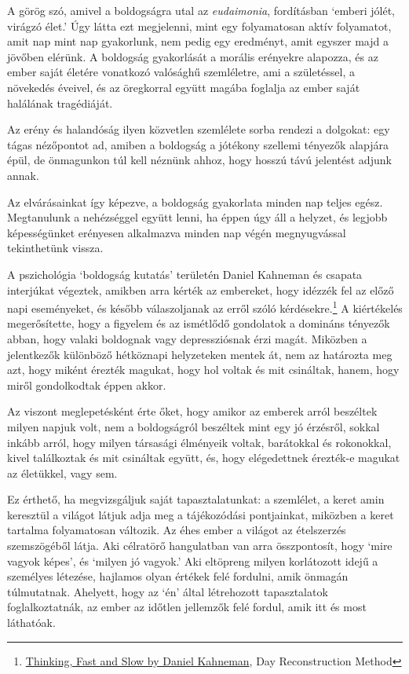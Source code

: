A görög szó, amivel a boldogságra utal az \emph{eudaimonia}, fordításban
`emberi jólét, virágzó élet.' Úgy látta ezt megjelenni, mint egy
folyamatosan aktív folyamatot, amit nap mint nap gyakorlunk, nem pedig
egy eredményt, amit egyszer majd a jövőben elérünk. A boldogság
gyakorlását a morális erényekre alapozza, és az ember saját életére
vonatkozó valósághű szemléletre, ami a születéssel, a növekedés éveivel,
és az öregkorral együtt magába foglalja az ember saját halálának
tragédiáját.

Az erény és halandóság ilyen közvetlen szemlélete sorba rendezi a
dolgokat: egy tágas nézőpontot ad, amiben a boldogság a jótékony
szellemi tényezők alapjára épül, de önmagunkon túl kell néznünk ahhoz,
hogy hosszú távú jelentést adjunk annak.

Az elvárásainkat így képezve, a boldogság gyakorlata minden nap teljes
egész. Megtanulunk a nehézséggel együtt lenni, ha éppen úgy áll a
helyzet, és legjobb képességünket erényesen alkalmazva minden nap végén
megnyugvással tekinthetünk vissza.

A pszichológia `boldogság kutatás' területén Daniel Kahneman és csapata
interjúkat végeztek, amikben arra kérték az embereket, hogy idézzék fel
az előző napi eseményeket, és később válaszoljanak az erről szóló
kérdésekre.\footnote{\href{https://www.goodreads.com/book/show/11468377-thinking-fast-and-slow}{Thinking,
  Fast and Slow by Daniel Kahneman}, Day Reconstruction Method} A
kiértékelés megerősítette, hogy a figyelem és az ismétlődő gondolatok a
domináns tényezők abban, hogy valaki boldognak vagy depressziósnak érzi
magát. Miközben a jelentkezők különböző hétköznapi helyzeteken mentek
át, nem az határozta meg azt, hogy miként érezték magukat, hogy hol
voltak és mit csináltak, hanem, hogy miről gondolkodtak éppen akkor.


\enlargethispage*{\baselineskip}

Az viszont meglepetésként érte őket, hogy amikor az emberek arról
beszéltek milyen napjuk volt, nem a boldogságról beszéltek mint egy jó
érzésről, sokkal inkább arról, hogy milyen társasági élményeik voltak,
barátokkal és rokonokkal, kivel találkoztak és mit csináltak együtt, és,
hogy elégedettnek érezték-e magukat az életükkel, vagy sem.

Ez érthető, ha megvizsgáljuk saját tapasztalatunkat: a szemlélet, a
keret amin keresztül a világot látjuk adja meg a tájékozódási
pontjainkat, miközben a keret tartalma folyamatosan változik. Az éhes
ember a világot az ételszerzés szemszögéből látja. Aki célratörő
hangulatban van arra összpontosít, hogy `mire vagyok képes', és `milyen
jó vagyok.' Aki eltöpreng milyen korlátozott idejű a személyes létezése,
hajlamos olyan értékek felé fordulni, amik önmagán túlmutatnak.
Ahelyett, hogy az `én' által létrehozott tapasztalatok foglalkoztatnák,
az ember az időtlen jellemzők felé fordul, amik itt és most láthatóak.

